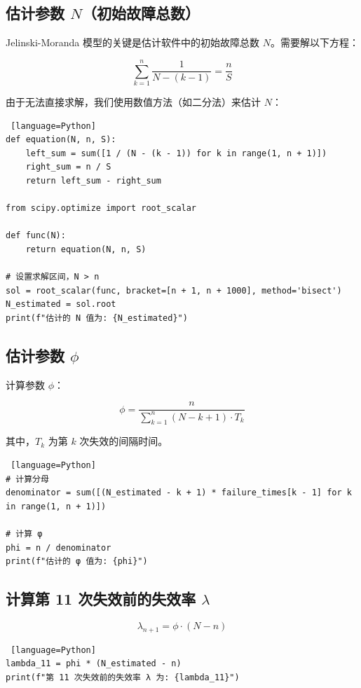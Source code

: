 \subsection*{估计参数 \( N \)（初始故障总数）}

Jelinski-Moranda 模型的关键是估计软件中的初始故障总数 \( N \)。需要解以下方程：

\[
\sum_{k=1}^{n} \frac{1}{N - (k - 1)} = \frac{n}{S}
\]

由于无法直接求解，我们使用数值方法（如二分法）来估计 \( N \)：

\begin{lstlisting} [language=Python]
def equation(N, n, S):
    left_sum = sum([1 / (N - (k - 1)) for k in range(1, n + 1)])
    right_sum = n / S
    return left_sum - right_sum

from scipy.optimize import root_scalar

def func(N):
    return equation(N, n, S)

# 设置求解区间，N > n
sol = root_scalar(func, bracket=[n + 1, n + 1000], method='bisect')
N_estimated = sol.root
print(f"估计的 N 值为: {N_estimated}")
\end{lstlisting}

\subsection*{估计参数 \( \phi \)}

计算参数 \( \phi \)：

\[
\phi = \frac{n}{\sum\limits_{k=1}^{n} (N - k + 1) \cdot T_k}
\]

其中，\( T_k \) 为第 \( k \) 次失效的间隔时间。

\begin{lstlisting} [language=Python]
# 计算分母
denominator = sum([(N_estimated - k + 1) * failure_times[k - 1] for k in range(1, n + 1)])

# 计算 φ
phi = n / denominator
print(f"估计的 φ 值为: {phi}")
\end{lstlisting}

\subsection*{计算第 11 次失效前的失效率 \( \lambda \)}

\[
\lambda_{n+1} = \phi \cdot (N - n)
\]

\begin{lstlisting} [language=Python]
lambda_11 = phi * (N_estimated - n)
print(f"第 11 次失效前的失效率 λ 为: {lambda_11}")
\end{lstlisting}

